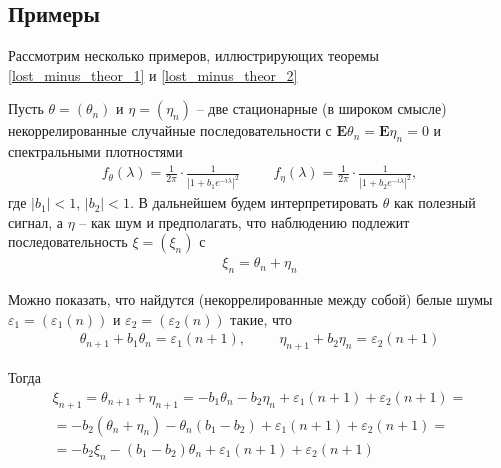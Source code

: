 \subsection*{Примеры}
Рассмотрим несколько примеров, иллюстрирующих теоремы \ref{lost_minus_theor_1} и \ref{lost_minus_theor_2}
\begin{example}
	Пусть $\theta = (\theta_n)$ и $\eta = (\eta_n)$ – две стационарные (в широком
	смысле) некоррелированные случайные последовательности с $\mathbf{E}\theta_n = \mathbf{E}\eta_n = 0$ и спектральными плотностями
	\begin{align*}
	f_{\theta}(\lambda) = \frac{1}{2 \pi} \cdot \frac{1}{|1 + b_1 e^{-i\lambda}|^2} \hspace{1cm} f_{\eta}(\lambda) = \frac{1}{2 \pi} \cdot \frac{1}{|1 + b_2 e^{-i\lambda}|^2},
	\end{align*}
	где $|b_1| < 1$, $|b_2| < 1$.
	В дальнейшем будем интерпретировать $\theta$ как полезный сигнал, а $\eta$ – как шум и предполагать, что наблюдению подлежит последовательность $\xi = (\xi_n)$ с
	\begin{align*}
	\xi_n = \theta_n + \eta_n
	\end{align*}

	Можно показать, что найдутся (некоррелированные между собой) белые шумы $\varepsilon_1 = (\varepsilon_1 (n))$ и $\varepsilon_2 = (\varepsilon_2 (n))$ такие, что
	\begin{align*}
	\theta_{n+1} + b_1\theta_n = \varepsilon_1 (n + 1), \hspace{1cm} \eta_{n+1} + b_2\eta_n = \varepsilon_2 (n + 1)
	\end{align*}
	
	Тогда
	\begin{multline*}
	\xi_{n+1} = \theta_{n+1} + \eta_{n+1} = -b_1\theta_n - b_2\eta_n + \varepsilon_1 (n + 1) + \varepsilon_2 (n + 1) = \\
	= -b_2 (\theta_n + \eta_n) - \theta_n (b_1 - b_2) + \varepsilon_1 (n + 1) + \varepsilon_2 (n + 1) = \\
	= -b_2\xi_n - (b_1 - b_2)\theta_n + \varepsilon_1 (n + 1) + \varepsilon_2 (n + 1)
	\end{multline*}


\end{example}
